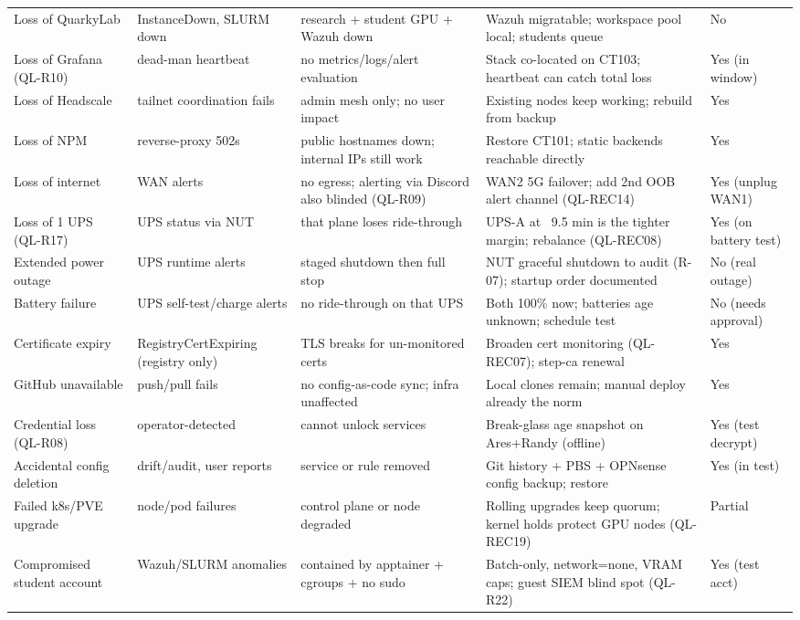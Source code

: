 \begin{tabularx}{\linewidth}{@{}p{2.5cm} p{2.6cm} p{2.6cm} X p{1.3cm}@{}}
Loss of QuarkyLab & InstanceDown, SLURM down & research + student GPU + Wazuh down & Wazuh migratable; workspace pool local; students queue & No \\
Loss of Grafana (QL-R10) & dead-man heartbeat & no metrics/logs/alert evaluation & Stack co-located on CT103; heartbeat can catch total loss & Yes (in window) \\
Loss of Headscale & tailnet coordination fails & admin mesh only; no user impact & Existing nodes keep working; rebuild from backup & Yes \\
Loss of NPM & reverse-proxy 502s & public hostnames down; internal IPs still work & Restore CT101; static backends reachable directly & Yes \\
Loss of internet & WAN alerts & no egress; alerting via Discord also blinded (QL-R09) & WAN2 5G failover; add 2nd OOB alert channel (QL-REC14) & Yes (unplug WAN1) \\
Loss of 1 UPS (QL-R17) & UPS status via NUT & that plane loses ride-through & UPS-A at ~9.5 min is the tighter margin; rebalance (QL-REC08) & Yes (on battery test) \\
Extended power outage & UPS runtime alerts & staged shutdown then full stop & NUT graceful shutdown to audit (R-07); startup order documented & No (real outage) \\
Battery failure & UPS self-test/charge alerts & no ride-through on that UPS & Both 100\% now; batteries age unknown; schedule test & No (needs approval) \\
Certificate expiry & RegistryCertExpiring (registry only) & TLS breaks for un-monitored certs & Broaden cert monitoring (QL-REC07); step-ca renewal & Yes \\
GitHub unavailable & push/pull fails & no config-as-code sync; infra unaffected & Local clones remain; manual deploy already the norm & Yes \\
Credential loss (QL-R08) & operator-detected & cannot unlock services & Break-glass age snapshot on Ares+Randy (offline) & Yes (test decrypt) \\
Accidental config deletion & drift/audit, user reports & service or rule removed & Git history + PBS + OPNsense config backup; restore & Yes (in test) \\
Failed k8s/PVE upgrade & node/pod failures & control plane or node degraded & Rolling upgrades keep quorum; kernel holds protect GPU nodes (QL-REC19) & Partial \\
Compromised student account & Wazuh/SLURM anomalies & contained by apptainer + cgroups + no sudo & Batch-only, network=none, VRAM caps; guest SIEM blind spot (QL-R22) & Yes (test acct) \\

\end{tabularx}
